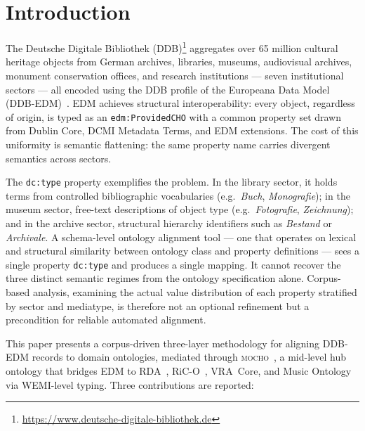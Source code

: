 
\section{Introduction}
\label{sec:introduction}

The Deutsche Digitale Bibliothek (DDB)\footnote{\url{https://www.deutsche-digitale-bibliothek.de}}
aggregates over 65 million cultural heritage objects from German archives,
libraries, museums, audiovisual archives, monument conservation offices, and
research institutions --- seven institutional sectors --- all encoded using the
DDB profile of the Europeana Data Model
(DDB-EDM)~\cite{ruehle2014ddbedm,edm2017definition}.
EDM achieves structural interoperability: every object, regardless of origin,
is typed as an \texttt{edm:ProvidedCHO} with a common property set drawn from
Dublin Core, DCMI Metadata Terms, and EDM extensions.
The cost of this uniformity is semantic flattening: the same property name
carries divergent semantics across sectors.

The \texttt{dc:type} property exemplifies the problem.
In the library sector, it holds terms from controlled bibliographic
vocabularies (e.g.\ \textit{Buch}, \textit{Monografie}); in the museum
sector, free-text descriptions of object type (e.g.\ \textit{Fotografie},
\textit{Zeichnung}); and in the archive sector, structural hierarchy
identifiers such as \textit{Bestand} or \textit{Archivale}.
A schema-level ontology alignment tool --- one that operates on lexical and
structural similarity between ontology class and property definitions --- sees
a single property \texttt{dc:type} and produces a single mapping.
It cannot recover the three distinct semantic regimes from the ontology
specification alone.
Corpus-based analysis, examining the actual value distribution of each
property stratified by sector and mediatype, is therefore not an optional
refinement but a precondition for reliable automated alignment.

This paper presents a corpus-driven three-layer methodology for aligning
DDB-EDM records to domain ontologies, mediated through
\textsc{mocho}~\cite{tan2026mocho}, a mid-level hub ontology that bridges EDM
to RDA~, RiC-O~, VRA~Core, and Music
Ontology~\cite{ceriani2018audio} via WEMI-level typing.
Three contributions are reported:


